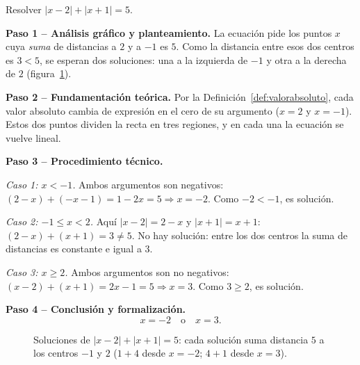 \begin{example} Resolver $|x-2| + |x+1| = 5$.

\begin{myproof}
\textbf{Paso 1 – Análisis gráfico y planteamiento.}
La ecuación pide los puntos $x$ cuya \emph{suma} de distancias a $2$ y a
$-1$ es $5$. Como la distancia entre esos dos centros es $3 < 5$, se
esperan dos soluciones: una a la izquierda de $-1$ y otra a la derecha de
$2$ (figura~\ref{fig:valabs_suma}).

\textbf{Paso 2 – Fundamentación teórica.}
Por la Definición~\ref{def:valorabsoluto}, cada valor absoluto cambia de
expresión en el cero de su argumento ($x = 2$ y $x = -1$). Estos dos
puntos dividen la recta en tres regiones, y en cada una la ecuación se
vuelve lineal.

\textbf{Paso 3 – Procedimiento técnico.}

\emph{Caso 1: $x < -1$.} Ambos argumentos son negativos:
$(2-x) + (-x-1) = 1 - 2x = 5 \Rightarrow x = -2$. Como $-2 < -1$, es
solución.

\emph{Caso 2: $-1 \leq x < 2$.} Aquí $|x-2| = 2-x$ y $|x+1| = x+1$:
$(2-x) + (x+1) = 3 \neq 5$. No hay solución: entre los dos centros la suma
de distancias es constante e igual a $3$.

\emph{Caso 3: $x \geq 2$.} Ambos argumentos son no negativos:
$(x-2) + (x+1) = 2x - 1 = 5 \Rightarrow x = 3$. Como $3 \geq 2$, es
solución.

\textbf{Paso 4 – Conclusión y formalización.}
\[
   \boxed{x = -2 \quad \text{o} \quad x = 3.}
\]

\begin{figure}[H]
\centering
{}
\caption{Soluciones de $|x-2|+|x+1|=5$: cada solución suma distancia $5$ a
los centros $-1$ y $2$ ($1+4$ desde $x=-2$; $4+1$ desde $x=3$).}
\label{fig:valabs_suma}
\end{figure}
\end{myproof}
\end{example}

